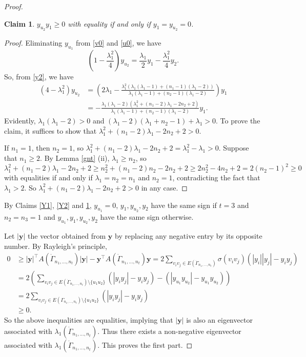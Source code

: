 \documentclass[12pt]{article}
\numberwithin{equation}{section}
\newtheorem {Claim} {Claim}[section]
\begin{document}
\begin{proof}
\begin{Claim}\label{Y3}
$y_{u_2}y_1\ge 0$ with equality if and only if $y_1=y_{u_2}=0$. 
\end{Claim}

\begin{proof}
Eliminating $y_{u_1}$ from \eqref{v0} and \eqref{u0}, we have
\[
\left(1-\frac{\lambda_1^2}{4}\right)y_{u_2}=\frac{\lambda_1}{2}y_1-\frac{\lambda_1^2}{4}y_2.
\]
So, from \eqref{y2}, we have
\begin{align*}
\left(4-\lambda_1^2\right)y_{u_2}& =\left(2\lambda_1-\frac{\lambda_1^2\left(\lambda_1(\lambda_1-1)+(n_1-1)(\lambda_1-2)\right)}{\lambda_1(\lambda_1-1)+(n_2-1)(\lambda_1-2)}\right)y_1\\
& =-\frac{\lambda_1(\lambda_1-2)(\lambda_1^2+(n_1-2)\lambda_1-2n_2+2)}{\lambda_1(\lambda_1-1)+(n_2-1)(\lambda_1-2)}y_1.
\end{align*}
Evidently, $\lambda_1(\lambda_1-2)>0$ and $(\lambda_1-2)(\lambda_1+n_2-1)+\lambda_1>0$. To prove the claim, it suffices to show that $\lambda_1^2+(n_1-2)\lambda_1-2n_2+2>0$.

 If $n_1=1$, then $n_2=1$, so $\lambda_1^2+(n_1-2)\lambda_1-2n_2+2=\lambda_1^2-\lambda_1>0$. 
Suppose that $n_1\ge 2$. By Lemma \ref{gnt} (ii), $\lambda_1\ge n_2$, so
\[
\lambda_1^2+(n_1-2)\lambda_1-2n_2+2\ge n_2^2+(n_1-2)n_2-2n_2+2\ge 2n_2^2-4n_2+2=2(n_2-1)^2\ge 0  
\]
with equalities if and only if $\lambda_1=n_2=n_1$ and $n_2=1$, contradicting the fact that $\lambda_1>2$. So 
 $\lambda_1^2+(n_1-2)\lambda_1-2n_2+2>0$ in any case.
\end{proof}




By Claims \ref{Y1}, \ref{Y2} and \ref{Y3}, $y_{u_1}=0$, $y_1, y_{u_2}, y_2$ have the same sign if $t=3$ and $n_2=n_3=1$ and $y_{u_1}, y_1, y_{u_2}, y_2$ have the same sign otherwise. 


Let $|\mathbf{y}|$ the vector obtained from $\mathbf{y}$ by replacing any negative entry by its opposite number. 
By Rayleigh's principle, 
\begin{align*}
0 & \ge |\mathbf{y}|^\top A(\dot\Gamma_{n_1, \dots, n_t})|\mathbf{y}|-\mathbf{y}^\top A(\dot\Gamma_{n_1, \dots, n_t})\mathbf{y} = 2\sum_{v_iv_j\in E(\dot\Gamma_{n_1, \dots, n_t})}\sigma(v_iv_j)\left(|y_i||y_j|-y_iy_j\right)\\
& = 2\left(\sum_{v_iv_j\in E(\dot\Gamma_{n_1, \dots,  n_t})\setminus\{u_1u_2\}}\left(|y_iy_j|-y_iy_j\right)-\left(|y_{u_1}y_{u_2}|-y_{u_1}y_{u_2}\right)\right)\\
& =2\sum_{v_iv_j\in E(\Gamma_{n_1, \dots, n_t})\setminus\{u_1u_2\}}\left(|y_iy_j|-y_iy_j\right)\\
& \ge 0.
\end{align*}
So the above inequalities are equalities, implying that $|\mathbf{y}|$ is also an eigenvector associated with $\lambda_1(\dot\Gamma_{n_1, \dots, n_t})$. 
Thus there exists a non-negative eigenvector associated with $\lambda_1(\dot\Gamma_{n_1, \dots, n_t})$. This proves the first part.



\end{proof}
\end{document}

